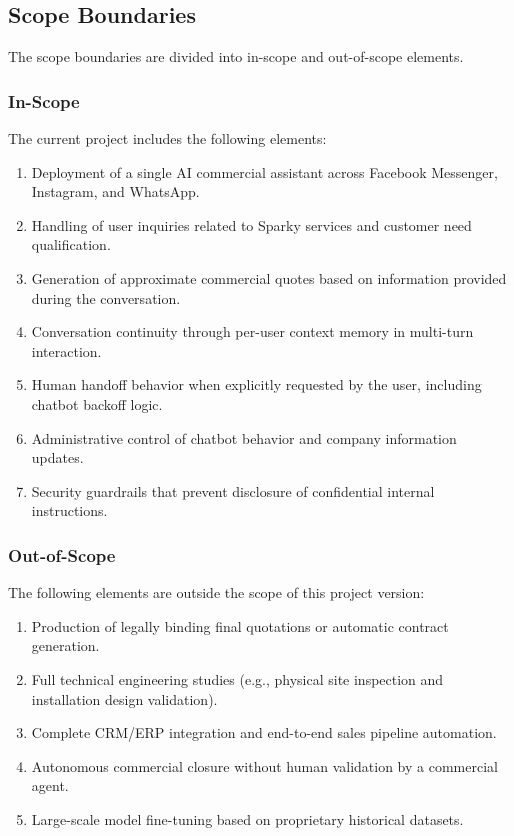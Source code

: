 \subsection{Scope Boundaries}
The scope boundaries are divided into in-scope and out-of-scope elements.

\subsubsection {In-Scope}
The current project includes the following elements:
\begin{enumerate}
    \item Deployment of a single AI commercial assistant across Facebook Messenger, Instagram, and WhatsApp.
    \item Handling of user inquiries related to Sparky services and customer need qualification.
    \item Generation of approximate commercial quotes based on information provided during the conversation.
    \item Conversation continuity through per-user context memory in multi-turn interaction.
    \item Human handoff behavior when explicitly requested by the user, including chatbot backoff logic.
    \item Administrative control of chatbot behavior and company information updates.
    \item Security guardrails that prevent disclosure of confidential internal instructions.
\end{enumerate}

\subsubsection {Out-of-Scope}
The following elements are outside the scope of this project version:
\begin{enumerate}
    \item Production of legally binding final quotations or automatic contract generation.
    \item Full technical engineering studies (e.g., physical site inspection and installation design validation).
    \item Complete CRM/ERP integration and end-to-end sales pipeline automation.
    \item Autonomous commercial closure without human validation by a commercial agent.
    \item Large-scale model fine-tuning based on proprietary historical datasets.
\end{enumerate}

